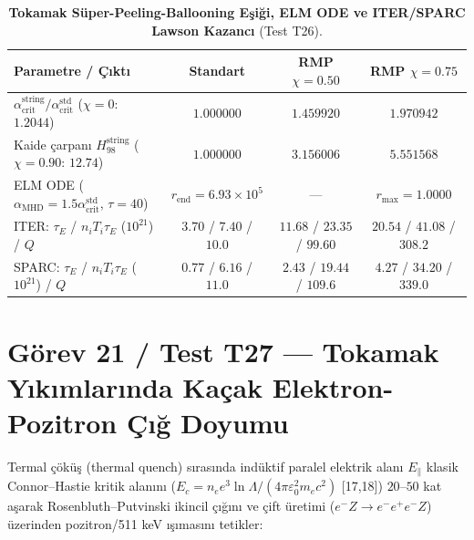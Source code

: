 \documentclass[12pt,a4paper]{article}
\begin{document}
\begin{table}[!htbp]
\centering
\footnotesize
\setlength{\tabcolsep}{2pt}
\caption{\textbf{Tokamak Süper-Peeling-Ballooning Eşiği, ELM ODE ve ITER/SPARC Lawson Kazancı} (Test T26).}
\label{tab:t26}
\vspace{0.1cm}
\begin{tabular}{@{}l|c|c|c@{}}
\hline
\textbf{Parametre / Çıktı} & \textbf{Standart} & \textbf{RMP $\chi=0.50$} & \textbf{RMP $\chi=0.75$} \\
\hline
$\alpha_{\mathrm{crit}}^{\mathrm{string}}/\alpha_{\mathrm{crit}}^{\mathrm{std}}$ ($\chi=0$: $1.2044$) & $1.000000$ & $1.459920$ & $1.970942$ \\
Kaide çarpanı $H_{98}^{\mathrm{string}}$ ($\chi=0.90$: $12.74$) & $1.000000$ & $3.156006$ & $5.551568$ \\
ELM ODE ($\alpha_{\mathrm{MHD}}=1.5\alpha_{\mathrm{crit}}^{\mathrm{std}}$, $\tau=40$) & $r_{\mathrm{end}}=6.93\times 10^5$ & --- & $r_{\max}=1.0000$ \\
ITER: $\tau_E$ / $n_i T_i \tau_E$ ($10^{21}$) / $Q$ & $3.70$ / $7.40$ / $10.0$ & $11.68$ / $23.35$ / $99.60$ & $20.54$ / $41.08$ / $308.2$ \\
SPARC: $\tau_E$ / $n_i T_i \tau_E$ ($10^{21}$) / $Q$ & $0.77$ / $6.16$ / $11.0$ & $2.43$ / $19.44$ / $109.6$ & $4.27$ / $34.20$ / $339.0$ \\
\hline
\end{tabular}
\end{table}

\section{Görev 21 / Test T27 --- Tokamak Yıkımlarında Kaçak Elektron-Pozitron Çığ Doyumu}

Termal çöküş (thermal quench) sırasında indüktif paralel elektrik alanı $E_\parallel$ klasik Connor--Hastie kritik alanını ($E_c = n_e e^3\ln\Lambda/(4\pi\varepsilon_0^2 m_e c^2)$ [17,18]) $20$--$50$ kat aşarak Rosenbluth--Putvinski ikincil çığını ve çift üretimi ($e^- Z \to e^- e^+ e^- Z$) üzerinden pozitron/511 keV ışımasını tetikler:
\end{document}
